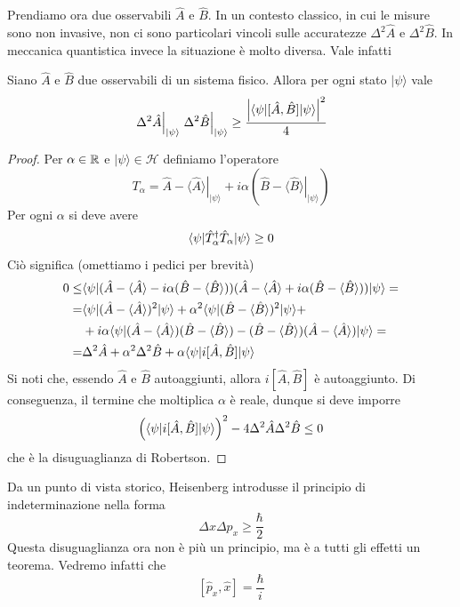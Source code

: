 \documentclass[a4paper, 11pt]{article}
\renewcommand{\H}{\mathcal{H}}
\renewcommand{\ket}[1]{| #1\rangle}
\begin{document}
Prendiamo ora due osservabili $\hat{A}$ e $\hat{B}$. In un contesto classico, in cui le misure sono non invasive, non ci sono particolari vincoli sulle accuratezze $\Delta^2\hat{A}$ e $\Delta^2\hat{B}$. In meccanica quantistica invece la situazione è molto diversa. Vale infatti
\begin{theorem}
	Siano $\hat{A}$ e $\hat{B}$ due osservabili di un sistema fisico. Allora per ogni stato $\ket{\psi}$ vale
	\[\left.\Delta^2\hat{A}\right|_{\ket{\psi}}\left.\Delta^2\hat{B}\right|_{\ket{\psi}}\geq\frac{\left|\braketop{\psi}{[\hat{A},\hat{B}]}{\psi}\right|^2}{4}\]
\end{theorem}
\begin{proof}
	Per $\alpha\in\mathbb{R}$ e $\ket{\psi}\in\H$ definiamo l'operatore
	\[T_\alpha=\hat{A}-\left.\langle\hat{A}\rangle\right|_{\ket{\psi}}+i\alpha\left(\hat{B}-\left.\langle\hat{B}\rangle\right|_{\ket{\psi}}\right)\]
	Per ogni $\alpha$ si deve avere
	\[\langle\psi|\hat{T}^\dagger_\alpha\hat{T}_\alpha|\psi\rangle\geq0\]
	Ciò significa (omettiamo i pedici per brevità)
	\begin{align*}
		0\leq&\langle\psi|(\hat{A}-\langle\hat{A}\rangle-i\alpha(\hat{B}-\langle\hat{B}\rangle))(\hat{A}-\langle\hat{A}\rangle+i\alpha(\hat{B}-\langle\hat{B}\rangle))|\psi\rangle=\\=&\langle\psi|(\hat{A}-\langle\hat{A}\rangle)^2|\psi\rangle+\alpha^2\langle\psi|(\hat{B}-\langle\hat{B}\rangle)^2|\psi\rangle+\\&+i\alpha\langle\psi|(\hat{A}-\langle\hat{A}\rangle)(\hat{B}-\langle\hat{B}\rangle)-(\hat{B}-\langle\hat{B}\rangle)(\hat{A}-\langle\hat{A}\rangle)|\psi\rangle=\\=&\Delta^2\hat{A}+\alpha^2\Delta^2\hat{B}+\alpha\langle\psi|i[\hat{A},\hat{B}]|\psi\rangle
	\end{align*}
	Si noti che, essendo $\hat{A}$ e $\hat{B}$ autoaggiunti, allora $i[\hat{A},\hat{B}]$ è autoaggiunto. Di conseguenza, il termine che moltiplica $\alpha$ è reale, dunque si deve imporre
	\[\left(\langle\psi|i[\hat{A},\hat{B}]|\psi\rangle\right)^2-4\Delta^2\hat{A}\Delta^2\hat{B}\leq0\]
	che è la disuguaglianza di Robertson.
\end{proof}
Da un punto di vista storico, Heisenberg introdusse il principio di indeterminazione nella forma
\[\Delta x\Delta p_x\geq\frac{\hbar}{2}\]
Questa disuguaglianza ora non è più un principio, ma è a tutti gli effetti un teorema. Vedremo infatti che
\[[\hat{p}_x,\hat{x}]=\frac{\hbar}{i}\]
\end{document}
